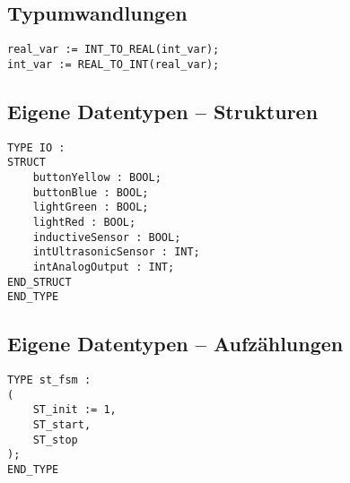 \subsection{Typumwandlungen}
\begin{lstlisting}
real_var := INT_TO_REAL(int_var);
int_var := REAL_TO_INT(real_var);
\end{lstlisting}

\clearpage

\subsection{Eigene Datentypen -- Strukturen}
\begin{lstlisting}
TYPE IO :
STRUCT
    buttonYellow : BOOL;
    buttonBlue : BOOL;
    lightGreen : BOOL;
    lightRed : BOOL;
    inductiveSensor : BOOL;
    intUltrasonicSensor : INT;
    intAnalogOutput : INT;
END_STRUCT
END_TYPE
\end{lstlisting}

\subsection{Eigene Datentypen -- Aufzählungen}
\begin{lstlisting}
TYPE st_fsm :
(
    ST_init := 1,
    ST_start,
    ST_stop
);
END_TYPE
\end{lstlisting}
